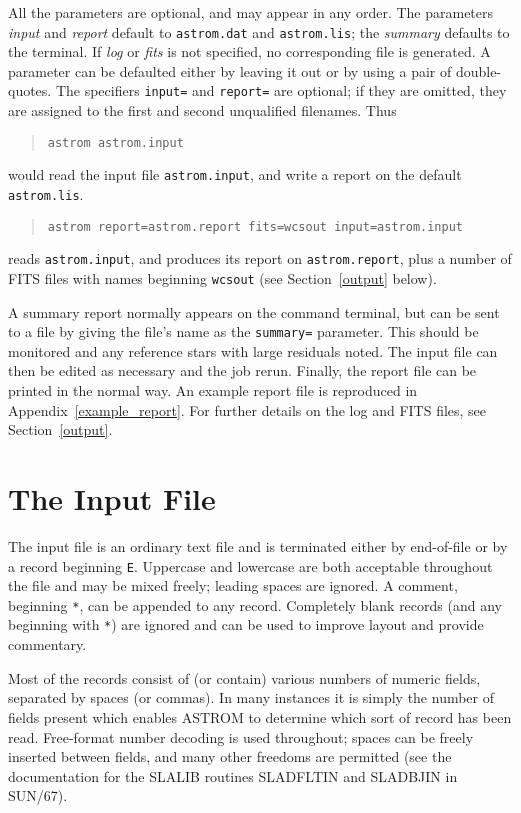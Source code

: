 \documentclass[twoside,11pt]{article}
\newcommand{\xref}[3]{#1}
\newcommand{\xlabel}[1]{}
\renewcommand{\_}{\texttt{\symbol{95}}}
\begin{document}
All the parameters are optional, and may appear in any order.  The
parameters \textit{input} and \textit{report} default to
\texttt{astrom.dat} and \texttt{astrom.lis}; the \textit{summary}
defaults to the terminal.  If \textit{log} or \textit{fits} is not
specified, no corresponding file is generated.  A parameter can be
defaulted either by leaving it out or by using a pair of
double-quotes.  The specifiers \texttt{input=} and \texttt{report=}
are optional; if they are omitted, they are assigned to the first and
second unqualified filenames.  Thus
\begin{quote}
\texttt{astrom astrom.input}
\end{quote}
would read the input file \texttt{astrom.input}, and write a report on
the default \texttt{astrom.lis}.
\begin{quote}
\texttt{astrom report=astrom.report fits=wcsout input=astrom.input}
\end{quote}
reads \texttt{astrom.input}, and produces its report on
\texttt{astrom.report}, plus a number of FITS files with names
beginning \texttt{wcsout} (see Section~\ref{output} below).

A summary report normally appears on the command terminal, but can be
sent to a file by giving the file's name as the \texttt{summary=}
parameter.  This should be monitored and any reference stars with
large residuals noted.  The input file can then be edited as necessary
and the job rerun.  Finally, the report file can be printed in the
normal way.  An example report file is reproduced in
Appendix~\ref{example_report}.  For further details on the log and
FITS files, see Section~\ref{output}.

\section{\xlabel{the_input_file}The Input File}
\label{the_input_file}

The input file is an ordinary text file and is terminated either
by end-of-file or by a record beginning \texttt{E}.  Uppercase and
lowercase are both acceptable throughout the file and may be mixed freely;
leading spaces are ignored.  A comment, beginning \texttt{*}, can be
appended to any record.  Completely blank records (and any beginning
with \texttt{*}) are ignored and can be used to improve layout and
provide commentary.

Most of the records consist of (or contain) various numbers of numeric
fields, separated by spaces (or commas).  In many instances it is
simply the number of fields present which enables ASTROM to determine
which sort of record has been read.  Free-format number decoding
is used throughout; spaces can be freely inserted between fields,
and many other freedoms are permitted (see the documentation for the
\xref{SLALIB}{sun67}{} routines \xref{SLA\_DFLTIN}{sun67}{SLA_DFLTIN}
and \xref{SLA\_DBJIN}{sun67}{SLA_DBJIN} in SUN/67).
\end{document}
